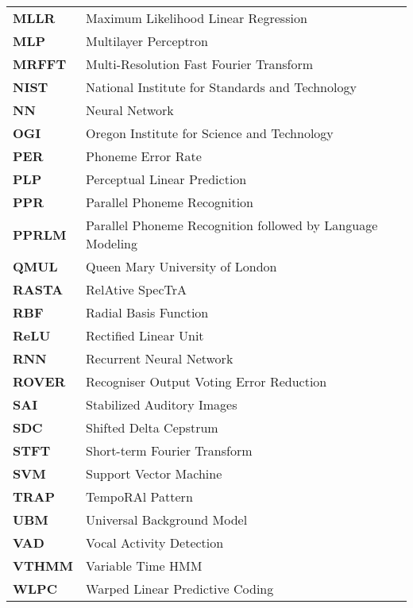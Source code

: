 \begin{longtable}{p{} p{}}
\textbf{MLLR} & Maximum Likelihood Linear Regression\\
\textbf{MLP} & Multilayer Perceptron\\
\textbf{MRFFT} & Multi-Resolution Fast Fourier Transform\\
\textbf{NIST} & National Institute for Standards and Technology\\
\textbf{NN} & Neural Network\\
\textbf{OGI} & Oregon Institute for Science and Technology\\
\textbf{PER} & Phoneme Error Rate\\
\textbf{PLP} & Perceptual Linear Prediction\\
\textbf{PPR} & Parallel Phoneme Recognition\\
\textbf{PPRLM} & Parallel Phoneme Recognition followed by Language Modeling\\
\textbf{QMUL} & Queen Mary University of London\\
\textbf{RASTA} & RelAtive SpecTrA\\
\textbf{RBF} & Radial Basis Function\\
\textbf{ReLU} & Rectified Linear Unit\\
\textbf{RNN} & Recurrent Neural Network\\
\textbf{ROVER} & Recogniser Output Voting Error Reduction\\
\textbf{SAI} & Stabilized Auditory Images\\
\textbf{SDC} & Shifted Delta Cepstrum\\
\textbf{STFT} & Short-term Fourier Transform\\
\textbf{SVM} & Support Vector Machine\\
\textbf{TRAP} & TempoRAl Pattern\\
\textbf{UBM} & Universal Background Model\\
\textbf{VAD} & Vocal Activity Detection\\
\textbf{VTHMM} & Variable Time HMM\\
\textbf{WLPC} & Warped Linear Predictive Coding\\

\end{longtable}
